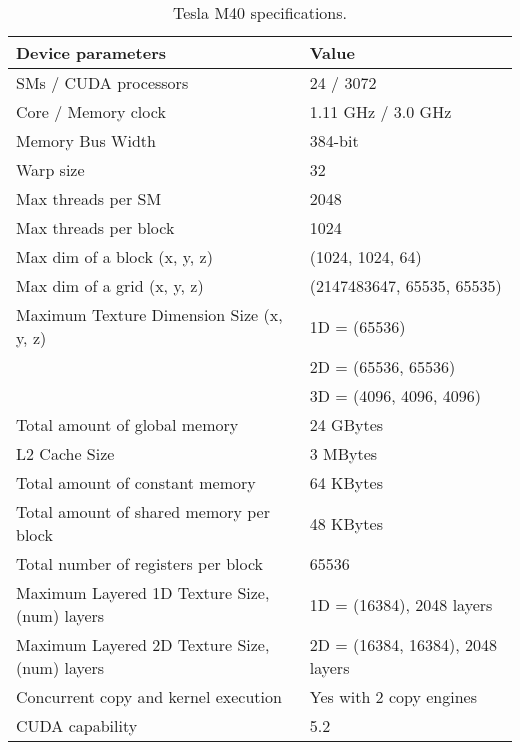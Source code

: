 \documentclass[format=acmsmall, review=false, screen=true]{acmart}
\begin{document}
\begin{table}[t]
  \renewcommand{\arraystretch}{1.3}
  \centering
  \scriptsize
  \caption{Tesla M40 specifications.}
  \begin{tabular}{ll}
    \hline
    \textbf{Device parameters} & \textbf{Value}\\
\hline
    SMs / CUDA processors & 24 / 3072\\
    Core / Memory clock & 1.11 GHz / 3.0 GHz\\
    Memory Bus Width & 384-bit\\
    Warp size & 32 \\
    Max threads per SM & 2048\\
    Max threads per block & 1024\\
    Max dim of a block (x, y, z) & (1024, 1024, 64)\\
    Max dim of a grid (x, y, z) & (2147483647, 65535, 65535)\\
    Maximum Texture Dimension Size (x, y, z) & 1D = (65536)\\
                                           & 2D = (65536, 65536)\\
                                           & 3D = (4096, 4096, 4096)\\
    Total amount of global memory & 24 GBytes\\
    L2 Cache Size & 3 MBytes\\
    Total amount of constant memory & 64 KBytes\\
    Total amount of shared memory per block & 48 KBytes\\
    Total number of registers per block & 65536\\
    Maximum Layered 1D Texture Size, (num) layers & 1D = (16384), 2048 layers\\
    Maximum Layered 2D Texture Size, (num) layers & 2D = (16384, 16384), 2048 layers\\
    Concurrent copy and kernel execution & Yes with 2 copy engines\\
    CUDA capability & 5.2\\
    \hline
  \end{tabular}
  \label{tbl_M40_specifications}
\end{table}
\end{document}
